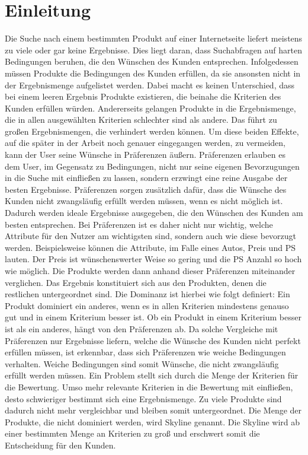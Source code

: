 \chapter{Einleitung}
\label{ch:Einleitung}
Die Suche nach einem bestimmten Produkt auf einer Internetseite liefert meistens zu viele oder gar keine Ergebnisse.  Dies liegt daran, dass Suchabfragen auf harten Bedingungen beruhen, die den Wünschen des Kunden entsprechen. Infolgedessen müssen Produkte die Bedingungen des Kunden erfüllen, da sie ansonsten nicht in der Ergebnismenge aufgelistet werden. Dabei macht es keinen Unterschied, dass bei einem leeren Ergebnis Produkte existieren, die beinahe die Kriterien des Kunden erfüllen würden. Andererseits gelangen Produkte in die Ergebnismenge, die in allen ausgewählten Kriterien schlechter sind als andere. Das führt zu großen Ergebnismengen, die verhindert werden können. Um diese beiden Effekte, auf die später in der Arbeit noch genauer eingegangen werden, zu vermeiden, kann der User seine Wünsche in Präferenzen äußern. Präferenzen erlauben es dem User, im Gegensatz zu Bedingungen, nicht nur seine eigenen Bevorzugungen in die Suche mit einfließen zu lassen, sondern erzwingt eine reine Ausgabe der besten Ergebnisse. Präferenzen sorgen zusätzlich dafür, dass die Wünsche des Kunden nicht zwangsläufig erfüllt werden müssen, wenn es nicht möglich ist. Dadurch werden ideale Ergebnisse ausgegeben, die den Wünschen des Kunden am besten entsprechen.
Bei Präferenzen ist es daher nicht nur wichtig, welche Attribute für den Nutzer am wichtigsten sind, sondern auch wie diese bevorzugt werden. Beispielsweise können die Attribute, im Falle eines Autos, Preis und PS lauten. Der Preis ist wünschenswerter Weise so gering und die PS Anzahl so hoch wie möglich.
Die Produkte werden dann anhand dieser Präferenzen miteinander verglichen. Das Ergebnis konstituiert sich aus den  Produkten, denen die restlichen untergeordnet sind. Die Dominanz ist hierbei wie folgt definiert: Ein Produkt dominiert ein anderes, wenn es in allen Kriterien mindestens genauso gut und in einem Kriterium besser ist. Ob ein Produkt in einem Kriterium besser ist als ein anderes, hängt von den Präferenzen ab. Da solche Vergleiche mit Präferenzen nur Ergebnisse liefern, welche die Wünsche des Kunden nicht perfekt erfüllen müssen, ist erkennbar, dass sich Präferenzen wie weiche Bedingungen verhalten. Weiche Bedingungen sind somit Wünsche, die nicht zwangsläufig erfüllt werden müssen.
Ein Problem stellt sich durch die Menge der Kriterien für die Bewertung. Umso mehr relevante Kriterien in die Bewertung mit einfließen, desto schwieriger bestimmt sich eine Ergebnismenge. Zu viele Produkte sind dadurch nicht mehr vergleichbar und bleiben somit untergeordnet. Die Menge der Produkte, die nicht dominiert werden, wird Skyline genannt. Die Skyline wird ab einer bestimmten Menge an Kriterien zu groß und  erschwert somit die Entscheidung für den Kunden. 
